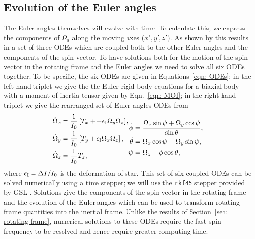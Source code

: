 \documentclass[../full_thesis/full_thesis.tex]{subfiles}
\begin{document}
\subsection{Evolution of the Euler angles}
\label{sec: evolution of the euler angles}
The Euler angles themselves will evolve with time. To calculate this, we
express the components of $\Omega_a$ along the moving axes ($x', y', z')$. As
shown by \citet{Landau1969} this results in a set of three ODEs which are
coupled both to the other Euler angles and the components of the spin-vector.
To have solutions both for the motion of the spin-vector in the rotating frame
and the Euler angles we need to solve all six ODEs together. To be specific,
the six ODEs are given in Equations~\eqref{eqn: ODEs}: in the left-hand triplet
we give the the Euler rigid-body equations for a biaxial body with a moment of
inertia tensor given by Eqn.~\eqref{eqn: MOI}; in the right-hand triplet we
give the rearranged set of Euler angles ODEs from \citet{Landau1969}.
\begin{align}
\begin{split}
\dot{\Omega}_{x} & = \frac{1}{I_{0}}\left[T_{x} +
                      -\epsilon_{\mathrm{I}} \Omega_{y} \Omega_{z}\right],
\\
\dot{\Omega}_{y} & = \frac{1}{I_{0}}\left[T_{y} +
                      \epsilon_{\mathrm{I}} \Omega_{x} \Omega_{z}\right],
\\
\dot{\Omega}_{z} & =\frac{1}{I_{0}}T_{z},
\end{split}
\begin{split}
\dot{\phi} & = \frac{\Omega_{x} \sin \psi + \Omega_{y} \cos \psi}{\sin \theta},\\
\dot{\theta} & = \Omega_{x} \cos \psi - \Omega_{y} \sin \psi,\\
\dot{\psi} & = \Omega_{z} - \dot{\phi} \cos \theta,
\end{split}
\label{eqn: ODEs}
\end{align}
where $\epsilon_{\mathrm{I}} = \Delta I/I_0$ is the deformation of star.
This set of six coupled ODEs can be solved numerically using a time stepper; we
will use the \texttt{rkf45} stepper provided by GSL \citep{gough2009gnu}.
Solutions give the components of the spin-vector in the rotating frame and the
evolution of the Euler angles which can be used to transform rotating frame
quantities into the inertial frame. Unlike the results of Section~\ref{sec:
rotating frame}, numerical solutions to these ODEs require the fast spin frequency
to be resolved and hence require greater computing time.

\end{document}
